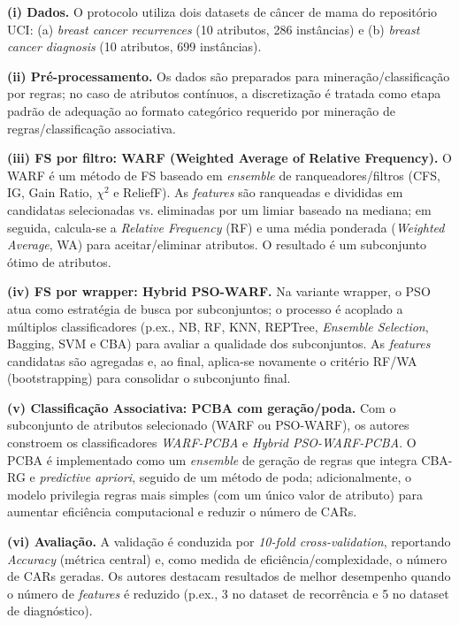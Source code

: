 \textbf{(i) Dados.}
O protocolo utiliza dois datasets de câncer de mama do repositório UCI: (a) \textit{breast cancer recurrences} (10 atributos, 286 instâncias) e (b) \textit{breast cancer diagnosis} (10 atributos, 699 instâncias).

\textbf{(ii) Pré-processamento.}
Os dados são preparados para mineração/classificação por regras; no caso de atributos contínuos, a discretização é tratada como etapa padrão de adequação ao formato categórico requerido por mineração de regras/classificação associativa.

\textbf{(iii) FS por filtro: WARF (Weighted Average of Relative Frequency).}
O WARF é um método de FS baseado em \textit{ensemble} de ranqueadores/filtros (CFS, IG, Gain Ratio, $\chi^2$ e ReliefF). As \textit{features} são ranqueadas e divididas em candidatas selecionadas vs. eliminadas por um limiar baseado na mediana; em seguida, calcula-se a \textit{Relative Frequency} (RF) e uma média ponderada (\textit{Weighted Average}, WA) para aceitar/eliminar atributos. O resultado é um subconjunto ótimo de atributos.

\textbf{(iv) FS por wrapper: Hybrid PSO-WARF.}
Na variante wrapper, o PSO atua como estratégia de busca por subconjuntos; o processo é acoplado a múltiplos classificadores (p.ex., NB, RF, KNN, REPTree, \textit{Ensemble Selection}, Bagging, SVM e CBA) para avaliar a qualidade dos subconjuntos. As \textit{features} candidatas são agregadas e, ao final, aplica-se novamente o critério RF/WA (bootstrapping) para consolidar o subconjunto final.

\textbf{(v) Classificação Associativa: PCBA com geração/poda.}
Com o subconjunto de atributos selecionado (WARF ou PSO-WARF), os autores constroem os classificadores \textit{WARF-PCBA} e \textit{Hybrid PSO-WARF-PCBA}. O PCBA é implementado como um \textit{ensemble} de geração de regras que integra CBA-RG e \textit{predictive apriori}, seguido de um método de poda; adicionalmente, o modelo privilegia regras mais simples (com um único valor de atributo) para aumentar eficiência computacional e reduzir o número de CARs.

\textbf{(vi) Avaliação.}
A validação é conduzida por \textit{10-fold cross-validation}, reportando \textit{Accuracy} (métrica central) e, como medida de eficiência/complexidade, o número de CARs geradas. Os autores destacam resultados de melhor desempenho quando o número de \textit{features} é reduzido (p.ex., 3 no dataset de recorrência e 5 no dataset de diagnóstico).


